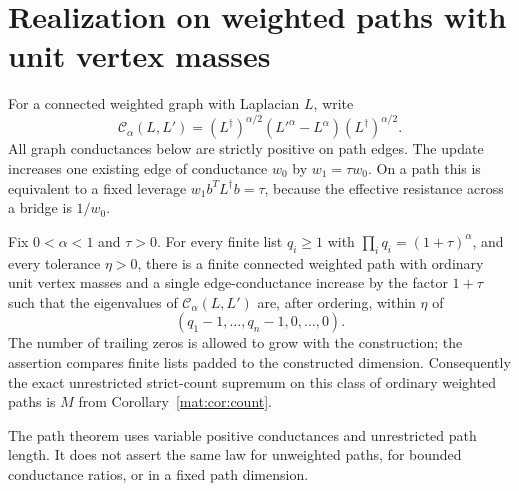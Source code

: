 \section{Realization on weighted paths with unit vertex masses}\label{w:sec:weighted}
For a connected weighted graph with Laplacian $L$, write
\[
 \mathcal C_\alpha(L,L')
  =(L^\dagger)^{\alpha/2}(L'^\alpha-L^\alpha)(L^\dagger)^{\alpha/2}.
\]
All graph conductances below are strictly positive on path edges.
The update increases one existing edge of conductance $w_0$ by
$w_1=\tau w_0$. On a path this is equivalent to a fixed leverage
$w_1 b^TL^\dagger b=\tau$, because the effective resistance across a
bridge is $1/w_0$.

\begin{theorem}\label{w:thm:path}
Fix $0<\alpha<1$ and $\tau>0$. For every finite list
$q_i\ge1$ with $\prod_iq_i=(1+\tau)^\alpha$, and every tolerance
$\eta>0$, there is a finite connected weighted path with ordinary
unit vertex masses and a single edge-conductance increase by the
factor $1+\tau$ such that the eigenvalues of
$\mathcal C_\alpha(L,L')$ are, after ordering, within $\eta$ of
\[
 (q_1-1,\ldots,q_n-1,0,\ldots,0).
\]
The number of trailing zeros is allowed to grow with the construction;
the assertion compares finite lists padded to the constructed dimension.
Consequently the exact unrestricted strict-count supremum on this class
of ordinary weighted paths is $M$ from Corollary~\ref{mat:cor:count}.
\end{theorem}

The path theorem uses variable positive conductances and unrestricted
path length. It does not assert the same law for unweighted paths, for
bounded conductance ratios, or in a fixed path dimension.

